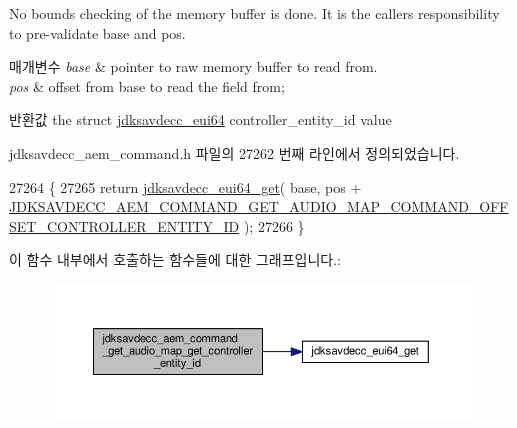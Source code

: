 No bounds checking of the memory buffer is done. It is the caller\textquotesingle{}s responsibility to pre-\/validate base and pos.


\begin{DoxyParams}{매개변수}
{\em base} & pointer to raw memory buffer to read from. \\
\hline
{\em pos} & offset from base to read the field from; \\
\hline
\end{DoxyParams}
\begin{DoxyReturn}{반환값}
the struct \hyperlink{structjdksavdecc__eui64}{jdksavdecc\+\_\+eui64} controller\+\_\+entity\+\_\+id value 
\end{DoxyReturn}


jdksavdecc\+\_\+aem\+\_\+command.\+h 파일의 27262 번째 라인에서 정의되었습니다.


\begin{DoxyCode}
27264 \{
27265     \textcolor{keywordflow}{return} \hyperlink{group__eui64_ga2652311a25a6b91cddbed75c108c7031}{jdksavdecc\_eui64\_get}( base, pos + 
      \hyperlink{group__command__get__audio__map_gad82c059e9b0495ef3231aa07e1fb5f95}{JDKSAVDECC\_AEM\_COMMAND\_GET\_AUDIO\_MAP\_COMMAND\_OFFSET\_CONTROLLER\_ENTITY\_ID}
       );
27266 \}
\end{DoxyCode}


이 함수 내부에서 호출하는 함수들에 대한 그래프입니다.\+:
\nopagebreak
\begin{figure}[H]
\begin{center}
\leavevmode
\includegraphics[width=350pt]{group__command__get__audio__map_ga683998f3d1c9ff2ca10e0d5d5d42a1c9_cgraph}
\end{center}
\end{figure}


